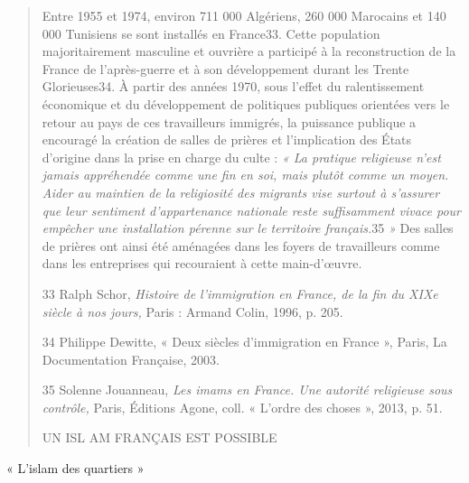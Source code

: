 \begin{quote}
Entre 1955 et 1974, environ 711 000 Algériens, 260 000 Marocains et 140
000 Tunisiens se sont installés en France33. Cette population
majoritairement masculine et ouvrière a participé à la reconstruction de
la France de l'après-guerre et à son développement durant les Trente
Glorieuses34. À partir des années 1970, sous l'effet du ralentissement
économique et du développement de politiques publiques orientées vers le
retour au pays de ces travailleurs immigrés, la puissance publique a
encouragé la création de salles de prières et l'implication des États
d'origine dans la prise en charge du culte : \emph{« La pratique
religieuse n'est jamais appréhendée comme une fin en soi, mais plutôt
comme un moyen. Aider au maintien de la religiosité des migrants vise
surtout à s'assurer que leur sentiment d'appartenance nationale reste
suffisamment vivace pour empêcher une installation pérenne sur le
territoire français.}35 \emph{»} Des salles de prières ont ainsi été
aménagées dans les foyers de travailleurs comme dans les entreprises qui
recouraient à cette main-d'œuvre.

33 Ralph Schor, \emph{Histoire de l'immigration en France, de la fin du
XIXe siècle à nos jours,} Paris : Armand Colin, 1996, p. 205.

34 Philippe Dewitte, « Deux siècles d'immigration en France », Paris, La
Documentation Française, 2003.

35 Solenne Jouanneau, \emph{Les imams en France. Une autorité religieuse
sous contrôle,} Paris, Éditions Agone, coll. « L'ordre des choses »,
2013, p. 51.

UN ISL AM FRANÇAIS EST POSSIBLE
\end{quote}

« L'islam des quartiers »

